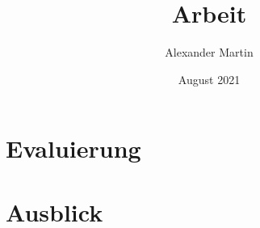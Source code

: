\documentclass[12pt,titlepage]{report}
\title{Arbeit}
\author{Alexander Martin}
\date{August 2021}
\begin{document}

\newpage

\newpage

\newpage

\pagestyle{fancy}
\tableofcontents
\newpage






\chapter{Evaluierung}
\chapter{Ausblick}

\newpage

\printbibliography
\end{document}
